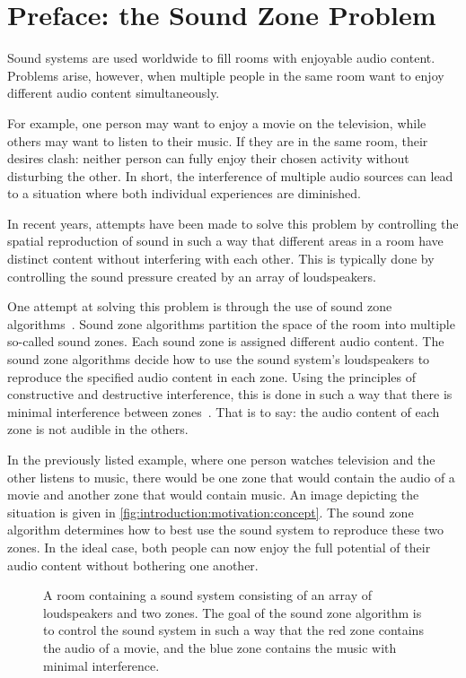 \section{Preface: the Sound Zone Problem}
\label{ch:introduction:preface}
Sound systems are used worldwide to fill rooms with enjoyable audio content. 
Problems arise, however, when multiple people in the same room want to enjoy different audio content simultaneously.

For example, one person may want to enjoy a movie on the television, while others may want to listen to their music.
If they are in the same room, their desires clash: neither person can fully enjoy their chosen activity without disturbing
the other.
In short, the interference of multiple audio sources can lead to a situation where both individual experiences are diminished.

In recent years, attempts have been made to solve this problem by controlling the spatial reproduction of sound in such
a way that different areas in a room have distinct content without interfering with each other.
This is typically done by controlling the sound pressure created by an array of loudspeakers.

One attempt at solving this problem is through the use of sound zone algorithms~\cite{betlehem2015personal}.
Sound zone algorithms partition the space of the room into multiple so-called sound zones.
Each sound zone is assigned different audio content.
The sound zone algorithms decide how to use the sound system's loudspeakers to reproduce the specified audio content in each zone.
Using the principles of constructive and destructive interference, this is done in such a way that there is 
minimal interference between zones~\cite{betlehem2015personal}.
That is to say: the audio content of each zone is not audible in the others.

In the previously listed example, where one person watches television and the other listens to music,
there would be one zone that would contain the audio of a movie and another zone that would contain music.
An image depicting the situation is given in \autoref{fig:introduction:motivation:concept}.
The sound zone algorithm determines how to best use the sound system to reproduce these two zones.
In the ideal case, both people can now enjoy the full potential of their audio content without bothering one another.

\begin{figure}[]
    \centering
    \scalebox{1.0}{}
    \caption{A room containing a sound system consisting of an array of loudspeakers and two zones.
                The goal of the sound zone algorithm is to control the sound system in such a way that the red zone
                contains the audio of a movie, and the blue zone contains the music with minimal interference.}
    \label{fig:introduction:motivation:concept}
\end{figure}

